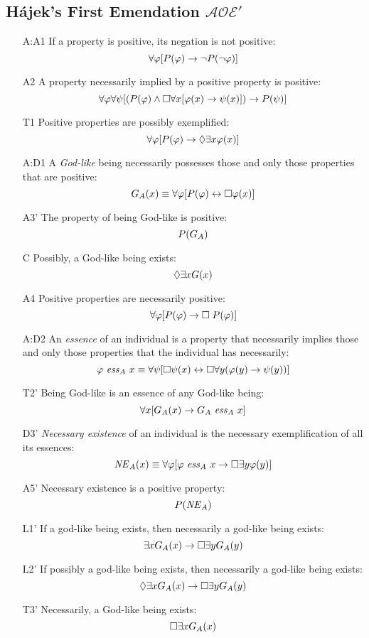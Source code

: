 \documentclass{birkjour}
\newcommand{\AOEH}{$\mathcal{AOE}'$}
\theoremstyle{definition}
\theoremstyle{remark}
\numberwithin{equation}{section}
\begin{document}
\begin{appendix}
\section{Hájek's First Emendation \AOEH} \label{apx:Hajek1}

\begin{itemize}
\item[A:A1] If a property is positive, its negation is not positive:
  $$\forall \varphi [P(\varphi) \rightarrow \neg P(\neg \varphi)]$$ 
\item[A2] A property necessarily implied by a
  positive property is positive:
  $$\forall \varphi \forall \psi [(P(\varphi) \wedge \Box \forall x [\varphi(x)
  \rightarrow \psi(x)]) \rightarrow P(\psi)]$$
\item[T1] Positive properties are possibly exemplified: 
  $$\forall \varphi [P(\varphi) \rightarrow \Diamond \exists x \varphi(x)]$$ 
\item[A:D1] A \emph{God-like} being necessarily possesses those and only those properties that are positive: 
  $$G_A(x) \equiv \forall \varphi [P(\varphi) \leftrightarrow \Box \varphi(x)]$$ 
\item[A3']  The property of being God-like is positive: 
  $$P(G_A)$$
\item[C\phantom{1}] Possibly, a God-like being exists: $$\Diamond \exists x G(x)$$
\item[A4]  Positive properties are necessarily positive: 
  $$\forall \varphi [P(\varphi) \rightarrow \Box \; P(\varphi)]$$ 
\item[A:D2] An \emph{essence} of an individual is a property that necessarily implies those and only those properties that the individual has necessarily: $$\varphi \ \mathit{ess}_A \ x \equiv \forall
  \psi [\Box \psi(x) \leftrightarrow \Box \forall y (\varphi(y) \rightarrow \psi(y))]$$ 
\item[T2']  Being God-like is an essence of any
  God-like being: $$\forall x [G_A(x) \rightarrow G_A \ \mathit{ess}_A \ x]$$
\item[D3'] \emph{Necessary existence} of an individual is the necessary exemplification of all its essences: 
  $$\mathit{NE}_A(x) \equiv \forall \varphi [\varphi \ \mathit{ess}_A \ x \rightarrow \Box
  \exists y \varphi(y)]$$
\item[A5'] Necessary existence is a positive property: $$P(\mathit{NE}_A)$$ 
\item[L1'] If a god-like being exists, then necessarily a god-like being exists: 
  $$\exists x G_A(x) \rightarrow \Box \exists y G_A(y)$$
\item[L2'] If possibly a god-like being exists, then necessarily a god-like being exists: 
  $$\Diamond \exists x G_A(x) \rightarrow \Box \exists y G_A(y) $$
%
\item[T3'] Necessarily, a God-like being exists: $$\Box \exists x G_A(x)$$ 
\end{itemize}



\end{appendix}
\end{document}
